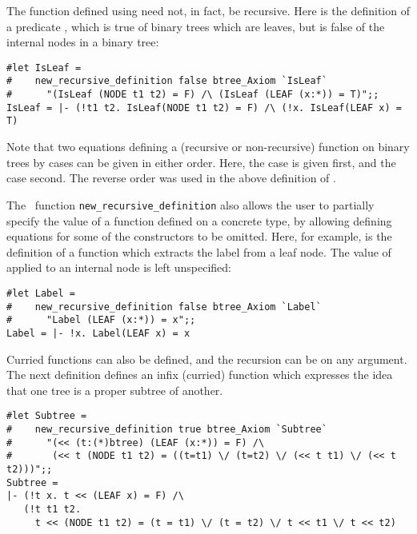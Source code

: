 {{The function defined using  need not, in fact, be recursive.
Here is the definition of a predicate \ml{IsLeaf}, which is true of
binary trees which are leaves, but is false of the internal nodes in a
binary tree:

\begin{session}\begin{verbatim}
#let IsLeaf = 
#    new_recursive_definition false btree_Axiom `IsLeaf` 
#      "(IsLeaf (NODE t1 t2) = F) /\ (IsLeaf (LEAF (x:*)) = T)";;
IsLeaf = |- (!t1 t2. IsLeaf(NODE t1 t2) = F) /\ (!x. IsLeaf(LEAF x) = T)
\end{verbatim}\end{session}

\noindent Note that two equations defining a (recursive or non-recursive)
function on binary trees by cases can be given in either order.  Here, the
\ml{NODE} case is given first, and the \ml{LEAF} case second.  The reverse
order was used in the above definition of \ml{Leaves}.

The \ML\ function  {\small\verb!new_recursive_definition!} also allows the user
to partially specify the value of a function defined on a concrete type, by
allowing defining equations for some of the constructors to be omitted.  Here,
for example, is the definition of a function  which extracts the
label from a leaf node.  The value of \ml{Label} applied to an internal node
is left unspecified:

\begin{session}\begin{verbatim}
#let Label = 
#    new_recursive_definition false btree_Axiom `Label` 
#      "Label (LEAF (x:*)) = x";;
Label = |- !x. Label(LEAF x) = x
\end{verbatim}\end{session}

Curried functions can also be defined, and the recursion can be on any
argument.  The next definition defines an infix (curried)
function \ml{<<} which expresses the idea that one tree is a proper
subtree of another.

\begin{session}\begin{verbatim}
#let Subtree = 
#    new_recursive_definition true btree_Axiom `Subtree` 
#      "(<< (t:(*)btree) (LEAF (x:*)) = F) /\
#       (<< t (NODE t1 t2) = ((t=t1) \/ (t=t2) \/ (<< t t1) \/ (<< t t2)))";;
Subtree = 
|- (!t x. t << (LEAF x) = F) /\
   (!t t1 t2.
     t << (NODE t1 t2) = (t = t1) \/ (t = t2) \/ t << t1 \/ t << t2)
\end{verbatim}\end{session}

}}
